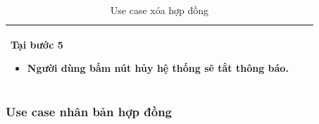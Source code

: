 \documentclass[12pt,a4paper]{article}
\begin{document}
\begin{table}[H]
\begin{tabular}{|p{3.5cm}|p{11.5cm}|c|}
            Tại bước 5\newline
            \vspace{-.8cm}\begin{itemize}
                              \item Người dùng bấm nút hủy hệ thống sẽ tắt thông báo.
            \end{itemize} \\
            \hline
        \end{tabular}
        \caption{Use case xóa hợp đồng }

    \end{table}

    \subsubsection*{Use case nhân bản hợp đồng }
\end{document}
